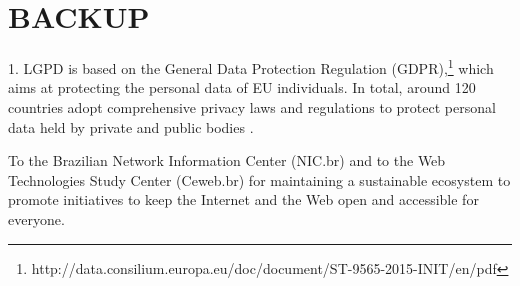 \documentclass[sigconf]{acmart}
\begin{document}
\section{BACKUP}
1.%
LGPD is based on the General Data Protection Regulation (GDPR),\footnote{http://data.consilium.europa.eu/doc/document/ST-9565-2015-INIT/en/pdf} which aims at protecting the personal data of EU individuals. In total, around 120 countries adopt comprehensive privacy laws and regulations to protect personal data held by private and public bodies \cite{Banisar2011}.



%
\begin{acks}
To the Brazilian Network Information Center (NIC.br) and to the Web Technologies Study Center (Ceweb.br) for maintaining a sustainable ecosystem to promote initiatives to keep the Internet and the Web open and accessible for everyone.
\end{acks}

%


\end{document}
